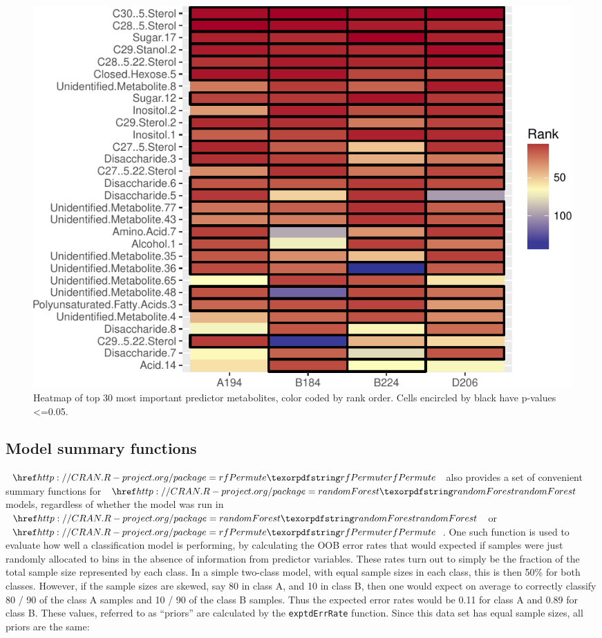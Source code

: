 \begin{Schunk}
\begin{figure}
\includegraphics{archer_files/figure-latex/impHeatmap-1} \caption[Heatmap of top 30 most important predictor metabolites, color coded by rank order]{Heatmap of top 30 most important predictor metabolites, color coded by rank order. Cells encircled by black have p-values <=0.05.}\label{fig:impHeatmap}
\end{figure}
\end{Schunk}

\subsection{Model summary functions}\label{model-summary-functions}

\(\CRANpkg{rfPermute}\) also provides a set of convenient summary
functions for \(\CRANpkg{randomForest}\) models, regardless of whether
the model was run in \(\CRANpkg{randomForest}\) or
\(\CRANpkg{rfPermute}\). One such function is used to evaluate how well
a classification model is performing, by calculating the OOB error rates
that would expected if samples were just randomly allocated to bins in
the absence of information from predictor variables. These rates turn
out to simply be the fraction of the total sample size represented by
each class. In a simple two-class model, with equal sample sizes in each
class, this is then 50\% for both classes. However, if the sample sizes
are skewed, say 80 in class A, and 10 in class B, then one would expect
on average to correctly classify 80 / 90 of the class A samples and 10 /
90 of the class B samples. Thus the expected error rates would be 0.11
for class A and 0.89 for class B. These values, referred to as
``priors'' are calculated by the \texttt{exptdErrRate} function. Since
this data set has equal sample sizes, all priors are the same:

